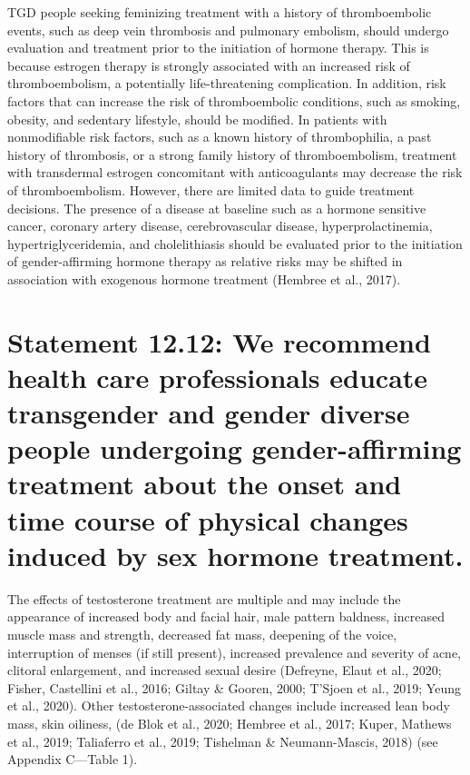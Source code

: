 \documentclass[
]{book}
\begin{document}
TGD people seeking feminizing treatment
with a history of thromboembolic events, such
as deep vein thrombosis and pulmonary embolism, should undergo evaluation and treatment
prior to the initiation of hormone therapy. This
is because estrogen therapy is strongly associated
with an increased risk of thromboembolism, a
potentially life-threatening complication. In
addition, risk factors that can increase the risk
of thromboembolic conditions, such as smoking,
obesity, and sedentary lifestyle, should be modified. In patients with nonmodifiable risk factors,
such as a known history of thrombophilia, a
past history of thrombosis, or a strong family
history of thromboembolism, treatment with
transdermal estrogen concomitant with anticoagulants may decrease the risk of thromboembolism. However, there are limited data to guide
treatment decisions. The presence of a disease
at baseline such as a hormone sensitive cancer,
coronary artery disease, cerebrovascular disease,
hyperprolactinemia, hypertriglyceridemia, and
cholelithiasis should be evaluated prior to the
initiation of gender-affirming hormone therapy
as relative risks may be shifted in association
with exogenous hormone treatment (Hembree
et al., 2017).

\hypertarget{statement-12.12-we-recommend-health-care-professionals-educate-transgender-and-gender-diverse-people-undergoing-gender-affirming-treatment-about-the-onset-and-time-course-of-physical-changes-induced-by-sex-hormone-treatment.}{%
\section*{Statement 12.12: We recommend health care professionals educate transgender and gender diverse people undergoing gender-affirming treatment about the onset and time course of physical changes induced by sex hormone treatment.}\label{statement-12.12-we-recommend-health-care-professionals-educate-transgender-and-gender-diverse-people-undergoing-gender-affirming-treatment-about-the-onset-and-time-course-of-physical-changes-induced-by-sex-hormone-treatment.}}

The effects of testosterone treatment are multiple and may include the appearance of increased
body and facial hair, male pattern baldness,
increased muscle mass and strength, decreased
fat mass, deepening of the voice, interruption of
menses (if still present), increased prevalence and
severity of acne, clitoral enlargement, and
increased sexual desire (Defreyne, Elaut et al.,
2020; Fisher, Castellini et al., 2016; Giltay \&
Gooren, 2000; T'Sjoen et al., 2019; Yeung et al.,
2020). Other testosterone-associated changes
include increased lean body mass, skin oiliness,
(de Blok et al., 2020; Hembree et al., 2017; Kuper,
Mathews et al., 2019; Taliaferro et al., 2019;
Tishelman \& Neumann-Mascis, 2018) (see
Appendix C---Table 1).
\end{document}

